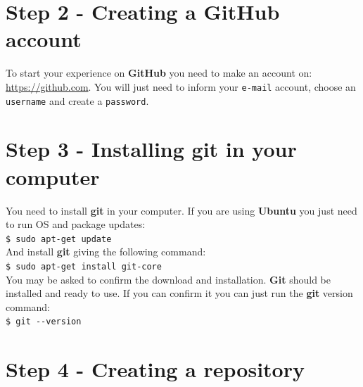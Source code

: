 \documentclass[12pt,a4paper,titlepage,brazil]{article}
\begin{document}

\section{Step 2 - Creating a GitHub account}

To start your experience on {\bf GitHub} you need to make an account on:
\url{https://github.com}. You will just need to inform your \texttt{e-mail} account, choose an \texttt{username} and create a \texttt{password}.


\section{Step 3 - Installing git in your computer}

You need to install {\bf git} in your computer. If you are using {\bf Ubuntu} you just need to run OS and package updates:\\

\texttt{\$ sudo apt-get update}\\

And install {\bf git} giving the following command:\\

\texttt{\$ sudo apt-get install git-core}\\

You may be asked to confirm the download and installation. {\bf Git} should be installed and ready to use. If you can confirm it you can just run the {\bf git} version command:\\

\texttt{\$ git -\hspace{0.01cm}-version}\\


\section{Step 4 - Creating a repository}
\end{document}

